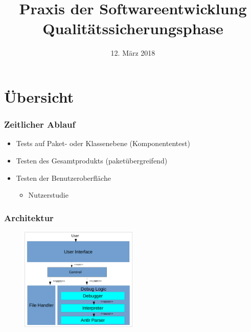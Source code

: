 \documentclass{beamer}
\title[Qualitätssicherungsphase]{Praxis der Softwareentwicklung\\ Qualitätssicherungsphase} %
\institute[PSE] %
{

}
\date{12. März 2018} %
\begin{document}
\begin{frame}
\titlepage %
\end{frame}



\section{Übersicht} 

\begin{frame}
\frametitle{Zeitlicher Ablauf}
\begin{itemize}
    \item Tests auf Paket- oder Klassenebene (Komponententest)
    \item Testen des Gesamtprodukts (paketübergreifend)
    \item Testen der Benutzeroberfläche
    \begin{itemize}
        \item Nutzerstudie
    \end{itemize}
\end{itemize}
\end{frame}

\begin{frame}
\frametitle{Architektur}
\begin{figure}
\centering
\includegraphics[width=0.5\textwidth]{../../Plichtenheft/Architektur.png}
\end{figure}
\end{frame}
\end{document}
